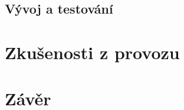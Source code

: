 \documentclass[12pt,oneside,final]{fithesis2}
\begin{document}
\section{Vývoj a testování}



\chapter{Zkušenosti z provozu}




\chapter{Závěr}





\begin{flushleft}
\end{flushleft}
\end{document}
